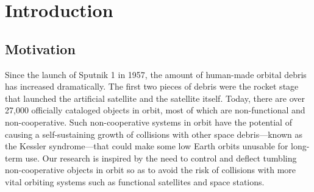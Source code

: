 \chapter{Introduction}
\label{ch:introduction}
\section{Motivation}
Since the launch of Sputnik 1 in 1957, the amount of human-made orbital debris has increased dramatically.
The first two pieces of debris were the rocket stage that launched the artificial satellite and the satellite itself.
Today, there are over 27,000 officially cataloged objects in orbit, most of which are non-functional and non-cooperative.  %
Such non-cooperative systems in orbit have the potential of causing a self-sustaining growth of collisions with other space debris---known as the Kessler syndrome---that could make some low Earth orbits unusable for long-term use.
Our research is inspired by the need to control and deflect tumbling non-cooperative objects in orbit so as to avoid the risk of collisions with more vital orbiting systems such as functional satellites and space stations.

